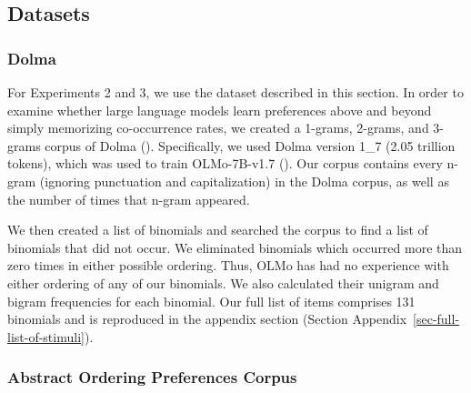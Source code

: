 \documentclass[
  12pt,
  letterpaper,
]{scrreprt}
\begin{document}
\subsection{Datasets}\label{datasets}

\subsubsection{Dolma}\label{dolma}

For Experiments 2 and 3, we use the dataset described in this section.
In order to examine whether large language models learn preferences
above and beyond simply memorizing co-occurrence rates, we created a
1-grams, 2-grams, and 3-grams corpus of Dolma
().
Specifically, we used Dolma version 1\_7 (2.05 trillion tokens), which
was used to train OLMo-7B-v1.7
(). Our corpus contains every n-gram (ignoring punctuation and
capitalization) in the Dolma corpus, as well as the number of times that
n-gram appeared.

We then created a list of binomials and searched the corpus to find a
list of binomials that did not occur. We eliminated binomials which
occurred more than zero times in either possible ordering. Thus, OLMo
has had no experience with either ordering of any of our binomials. We
also calculated their unigram and bigram frequencies for each binomial.
Our full list of items comprises 131 binomials and is reproduced in the
appendix section (Section Appendix~\ref{sec-full-list-of-stimuli}).

\subsubsection{Abstract Ordering Preferences
Corpus}\label{abstract-ordering-preferences-corpus}
\end{document}
